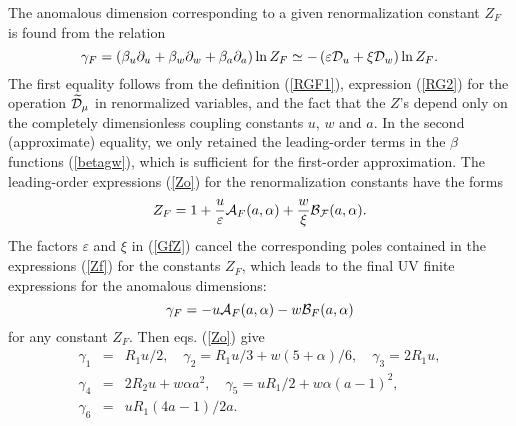 \documentclass[12pt]{iopart}
\begin{document}
The anomalous dimension corresponding to a given renormalization
constant $Z_{F}$ is found from the relation
\begin{equation}
\gamma_{F} = \left( \beta_{u}\partial_{u}+\beta_{w}\partial_{w}
+ \beta_{a}\partial_{a} \right) \ln Z_{F} \simeq  -
\left(\varepsilon {\cal D}_{u}+\xi {\cal D}  _{w}\right) \ln Z_{F}.
\label{GfZ}
\end{equation}
The first equality follows from the definition (\ref{RGF1}),
expression (\ref{RG2}) for the operation $\widetilde{\cal D}_{\mu}$
in renormalized
variables, and the fact that the $Z$'s depend only on the
completely dimensionless coupling constants $u$, $w$ and $a$. In
the second (approximate) equality, we only retained the
leading-order terms in the $\beta$ functions (\ref{betagw}), which
is sufficient for the first-order approximation. The leading-order
expressions (\ref{Zo}) for the renormalization constants have the
forms
\begin{equation}
Z_{F} = 1 + \frac{u}{\varepsilon}{\cal A}_{F}(a,\alpha) + \frac{w}{\xi}
{\cal B_{F}}(a,\alpha).
\label{Zf}
\end{equation}
The factors $\varepsilon$ and $\xi$
in (\ref{GfZ}) cancel the corresponding poles contained in the expressions
(\ref{Zf}) for the constants $Z_{F}$, which leads to the final UV finite
expressions for the anomalous dimensions:
\begin{equation}
\gamma_{F} = - u {\cal A}_{F}(a,\alpha) - w {\cal B}_{F}(a,\alpha)
\label{gift}
\end{equation}
for any constant $Z_{F}$. Then eqs. (\ref{Zo}) give
\begin{eqnarray}
\gamma_{1} &=& R_{1}u/2 , \quad \gamma_{2} = R_{1}u/3 + w
(5+\alpha)/6, \quad
\gamma_{3} = 2R_{1}u ,
\nonumber \\
\gamma_{4} &=& 2R_{2}u + w \alpha a^{2}, \quad \gamma_{5} = uR_{1}/2
+ w \alpha (a-1)^{2},
\nonumber \\
\gamma_{6}  &=& uR_{1}(4a-1 )/2a.
\label{anom}
\end{eqnarray}
\end{document}
